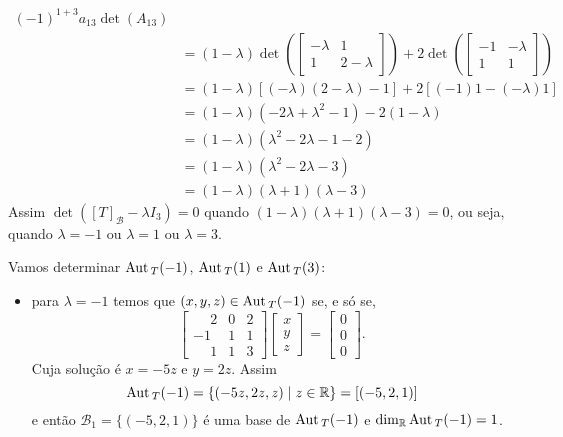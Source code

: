 \begin{exemplo}
\begin{enumerate}[label={\arabic*})]
\begin{solucao}
\begin{align*}
                    (-1)^{1 + 3}a_{13}\det(A_{13}) \\ &= (1 - \lambda)\det\left(\begin{bmatrix}-\lambda & 1\\1 & 2 -
                        \lambda\end{bmatrix}\right) + 2\det\left(\begin{bmatrix}-1 & -\lambda\\1 & 1\end{bmatrix}\right) \\ &=
                        (1 - \lambda)[(-\lambda)(2 - \lambda) - 1] + 2[(-1)1 - (-\lambda)1] \\ &= (1 - \lambda)(-2\lambda +
                        \lambda^2 - 1) - 2(1 - \lambda) \\ &= (1 - \lambda)(\lambda^2 - 2\lambda - 1 - 2) \\ &=
                        ( 1 -\lambda)(\lambda^2 - 2\lambda - 3) \\ &= (1 - \lambda)(\lambda + 1)(\lambda - 3)
                \end{align*}
                Assim $\det([T]_\mathcal{B} - \lambda I_3) = 0$ quando $(1 - \lambda)(\lambda + 1)(\lambda - 3) = 0$, ou seja, quando
                $\lambda = -1$ ou $\lambda = 1$ ou $\lambda = 3$.

                Vamos determinar ${\rm Aut\,}_T(-1)$, ${\rm Aut\,}_T(1)$ e ${\rm Aut\,}_T(3)$:
                \begin{itemize}
                    \item para $\lambda = -1$ temos que $(x,y,z) \in {\rm Aut\,}_T(-1)$ se, e s\'o se,
                        \[
                            \begin{bmatrix}
                                \phantom{-}2 & 0 & 2\\
                                -1 & 1 & 1\\
                                \phantom{-}1 & 1 & 3
                            \end{bmatrix}\begin{bmatrix}
                                x\\y\\z
                            \end{bmatrix} = \begin{bmatrix}
                                0\\0\\0
                            \end{bmatrix}.
                        \]
                        Cuja solução é $x = -5z$ e $y = 2z$. Assim
                        \[
                            {\rm Aut\,}_T(-1) = \{(-5z,2z,z) \mid z \in \mathbb{R}\} = [(-5,2,1)]
                        \]
                        e então $\mathcal{B}_1 = \{(-5,2,1)\}$ é uma base de ${\rm Aut\,}_T(-1)$ e $\dim_{\mathbb{R}}{\rm Aut\,}_T(-1) = 1$.


\end{itemize}
\end{solucao}
\end{enumerate}
\end{exemplo}
